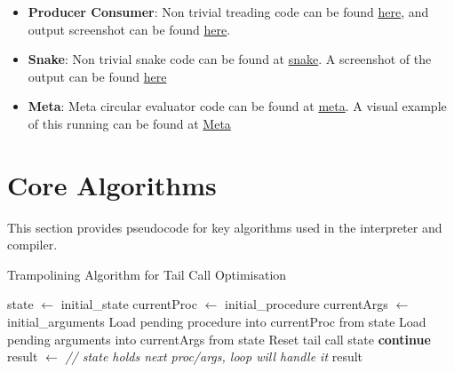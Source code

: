 \documentclass[final]{cmpreport_02}
\begin{document}
\label{tab:non-trivial}
\begin{itemize}
    \item \textbf{Producer Consumer}: Non trivial treading code can be found \href{https://github.com/jamie-wales/Jaws/blob/main/producer.scm}{here}, and output screenshot can be found \href{https://github.com/jamie-wales/Jaws/blob/main/assets/Producer.png}{here}.
    \item \textbf{Snake}: Non trivial snake code can be found at \href{https://github.com/Jamie-Wales/Jaws/blob/main/ffi_test/raylib.scm}{snake}. A screenshot of the output can be found \href{https://github.com/jamie-wales/Jaws/blob/assets/Snake_game.png}{here}
    \item \textbf{Meta}: Meta circular evaluator code can be found at \href{https://github.com/jamie-wales/Jaws/blob/meta.scm}{meta}. A visual example of this running can be found at \href{https://github.com/Jamie-Wales/Jaws/blob/main/assets/Meta.png}{Meta}

\end{itemize}



\section{Core Algorithms}
\label{app:core-algorithms}

This section provides pseudocode for key algorithms used in the interpreter and compiler.

\label{app:trampoline}


\begin{algorithm} 
\caption{Trampolining Algorithm for Tail Call Optimisation}
\label{alg:trampoline}
\begin{algorithmic}[1]
    \State state $\gets$ initial\_state
    \State currentProc $\gets$ initial\_procedure
    \State currentArgs $\gets$ initial\_arguments
    \Loop
            \State Load pending procedure into currentProc from state
            \State Load pending arguments into currentArgs from state
            \State Reset tail call state
            \State \textbf{continue} 
        \EndIf 
        \State result $\gets$  
            \State \textit{// state holds next proc/args, loop will handle it}
        \Else
            \State \Return result 
        \EndIf 
    \EndLoop 
\EndFunction
\end{algorithmic}
\end{algorithm}
\end{document}
